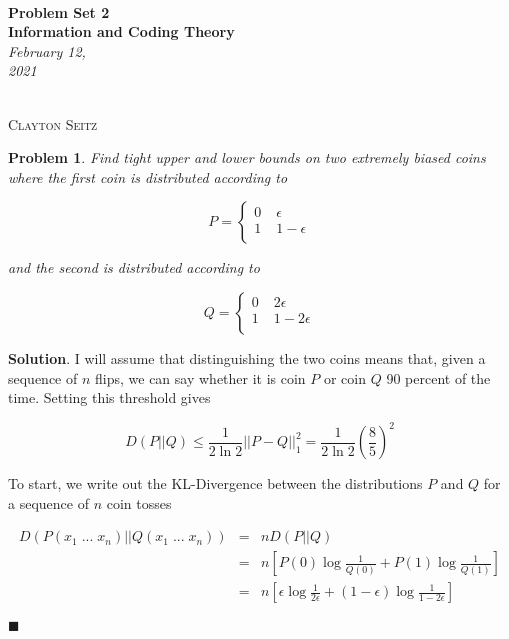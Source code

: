\documentclass[12pt]{article}
\newtheorem{p}{Problem}[section]
\theoremstyle{definition}
\newenvironment{s}{%
        \begin{trivlist} \item \textbf{Solution}. }{%
            \hspace*{\fill} $\blacksquare$\end{trivlist}}%
\begin{document}
{\noindent\Huge\bf  \\[0.5\baselineskip] {\selectfont  Problem Set 2}         }\\[2\baselineskip] %
{ {\bf {}\selectfont Information and Coding Theory}\\ {\textit{\selectfont     February 12, 2021}}}~~~~~~~~~~~~~~~~~~~~~~~~~~~~~~~~~~~~~~~~~~~~~~~~~~~~~~~~~~~~~~~~~~~~~~~~~~~~~    {\large \textsc{Clayton Seitz}
\\[1.4\baselineskip] 

\begin{p}
Find tight upper and lower bounds on two extremely biased coins where the first coin is distributed according to 

\[P = \begin{cases} 
      0 & \; \epsilon \\
      1 & \; 1 - \epsilon \\
   \end{cases}
\]

and the second is distributed according to

\[Q = \begin{cases} 
      0 & \; 2\epsilon \\
      1 & \; 1 - 2\epsilon \\
   \end{cases}
\]

\end{p}

\begin{s}
I will assume that distinguishing the two coins means that, given a sequence of $n$ flips, we can say whether it is coin $P$ or coin $Q$ 90 percent of the time. Setting this threshold gives

\begin{equation*}
D(P||Q) \leq \frac{1}{2\ln 2}||P-Q||_{1}^{2} = \frac{1}{2\ln 2}\left(\frac{8}{5}\right)^{2}
\end{equation*}


To start, we write out the KL-Divergence between the distributions $P$ and $Q$ for a sequence of $n$ coin tosses

\begin{eqnarray*}
D(P(x_{1} \;...\; x_{n}) || Q(x_{1} \;...\; x_{n})) &=& nD(P||Q)\\
&=& n\left[P(0)\log \frac{1}{Q(0)} + P(1)\log \frac{1}{Q(1)}\right]\\
&=& n\left[\epsilon\log \frac{1}{2\epsilon} + (1-\epsilon)\log \frac{1}{1-2\epsilon}\right]
\end{eqnarray*}

\end{s}
\end{document}
